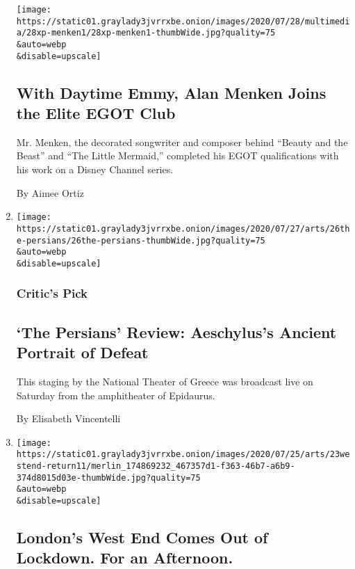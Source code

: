 \begin{enumerate}
  \texttt{[image: https://static01.graylady3jvrrxbe.onion/images/2020/07/28/multimedia/28xp-menken1/28xp-menken1-thumbWide.jpg?quality=75\\\&auto=webp\\\&disable=upscale]}

  \hypertarget{with-daytime-emmy-alan-menken-joins-the-elite-egot-club}{%
  \subsection{With Daytime Emmy, Alan Menken Joins the Elite EGOT
  Club}\label{with-daytime-emmy-alan-menken-joins-the-elite-egot-club}}

  Mr. Menken, the decorated songwriter and composer behind ``Beauty and
  the Beast'' and ``The Little Mermaid,'' completed his EGOT
  qualifications with his work on a Disney Channel series.

  By Aimee Ortiz
\item
  \href{/2020/07/26/theater/the-persians-review-aeschylus.html}{}

  \texttt{[image: https://static01.graylady3jvrrxbe.onion/images/2020/07/27/arts/26the-persians/26the-persians-thumbWide.jpg?quality=75\\\&auto=webp\\\&disable=upscale]}

  \hypertarget{critics-pick-1}{%
  \subsubsection{Critic's Pick}\label{critics-pick-1}}

  \hypertarget{the-persians-review-aeschyluss-ancient-portrait-of-defeat}{%
  \subsection{`The Persians' Review: Aeschylus's Ancient Portrait of
  Defeat}\label{the-persians-review-aeschyluss-ancient-portrait-of-defeat}}

  This staging by the National Theater of Greece was broadcast live on
  Saturday from the amphitheater of Epidaurus.

  By Elisabeth Vincentelli
\item
  \href{/2020/07/23/theater/west-end-london-virus.html}{}

  \texttt{[image: https://static01.graylady3jvrrxbe.onion/images/2020/07/25/arts/23westend-return11/merlin\_174869232\_467357d1-f363-46b7-a6b9-374d8015d03e-thumbWide.jpg?quality=75\\\&auto=webp\\\&disable=upscale]}

  \hypertarget{londons-west-end-comes-out-of-lockdown-for-an-afternoon}{%
  \subsection{London's West End Comes Out of Lockdown. For an
  Afternoon.}\label{londons-west-end-comes-out-of-lockdown-for-an-afternoon}}


\end{enumerate}
